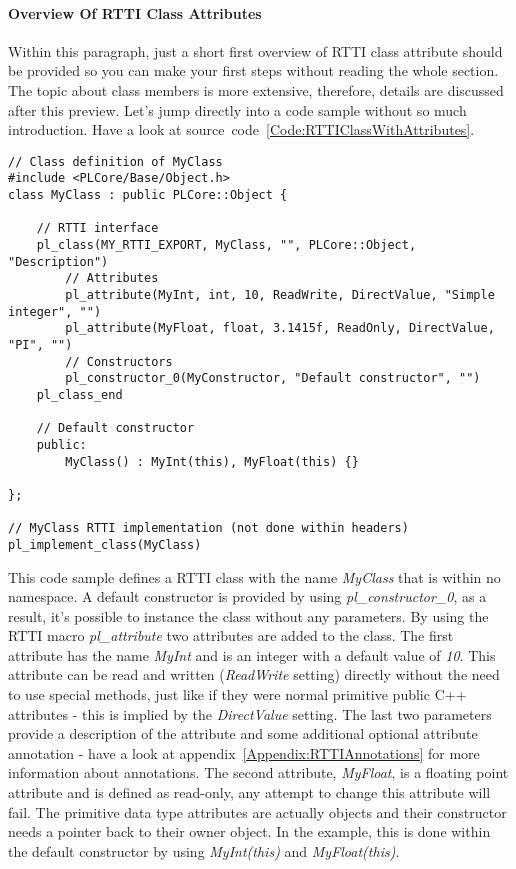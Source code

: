 \paragraph{Overview Of RTTI Class Attributes}
Within this paragraph, just a short first overview of RTTI class attribute should be provided so you can make your first steps without reading the whole section. The topic about class members is more extensive, therefore, details are discussed after this preview. Let's jump directly into a code sample without so much introduction. Have a look at source~code~\ref{Code:RTTIClassWithAttributes}.
\begin{lstlisting}[float=htb,label=Code:RTTIClassWithAttributes,caption={Defining a new RTTI class with attributes}]
// Class definition of MyClass
#include <PLCore/Base/Object.h>
class MyClass : public PLCore::Object {

	// RTTI interface
	pl_class(MY_RTTI_EXPORT, MyClass, "", PLCore::Object, "Description")
		// Attributes
		pl_attribute(MyInt, int, 10, ReadWrite, DirectValue, "Simple integer", "")
		pl_attribute(MyFloat, float, 3.1415f, ReadOnly, DirectValue, "PI", "")
		// Constructors
		pl_constructor_0(MyConstructor, "Default constructor", "")
	pl_class_end

	// Default constructor
	public:
		MyClass() : MyInt(this), MyFloat(this) {}

};

// MyClass RTTI implementation (not done within headers)
pl_implement_class(MyClass)
\end{lstlisting}
This code sample defines a RTTI class with the name \emph{MyClass} that is within no namespace. A default constructor is provided by using \emph{pl\_constructor\_0}, as a result, it's possible to instance the class without any parameters. By using the RTTI macro \emph{pl\_attribute} two attributes are added to the class. The first attribute has the name \emph{MyInt} and is an integer with a default value of \emph{10}. This attribute can be read and written (\emph{ReadWrite} setting) directly without the need to use special methods, just like if they were normal primitive public C++ attributes - this is implied by the \emph{DirectValue} setting. The last two parameters provide a description of the attribute and some additional optional attribute annotation - have a look at appendix~\ref{Appendix:RTTIAnnotations} for more information about annotations. The second attribute, \emph{MyFloat}, is a floating point attribute and is defined as read-only, any attempt to change this attribute will fail. The primitive data type attributes are actually objects and their constructor needs a pointer back to their owner object. In the example, this is done within the default constructor by using \emph{MyInt(this)} and \emph{MyFloat(this)}.

